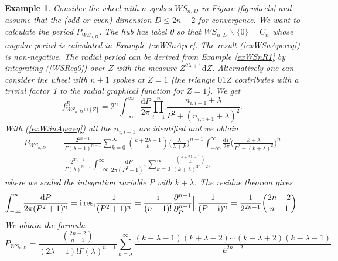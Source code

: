 \documentclass[oneside]{amsart}
\newcommand{\ii}{\mathrm{i}}
\newcommand{\dd}{\mathrm{d}}
\theoremstyle{plain}
\newtheorem{ex}[thm]{Example}
\begin{document}
\begin{ex}\label{exWSn1}
Consider the wheel with $n$ spokes $W\!S_{n,D}$ in Figure \ref{fig:wheels} and assume that the (odd or even) dimension $D\leq2n-2$ for convergence.
We want to calculate the period $P_{W\!S_{n,D}}$. The hub has label 0 so that $W\!S_{n,D}\backslash\{0\}=C_n$
whose angular period is calculated in Example \ref{exWSnAper}. The result (\ref{exWSnApereq}) is non-negative.
The radial period can be derived from Example \ref{exWSnR1} by integrating (\ref{WSReq0}) over $Z$ with the measure
$Z^{2\lambda+1}\dd Z$. Alternatively one can consider the wheel with $n+1$ spokes at $Z=1$ (the triangle $01Z$ contributes with a trivial factor 1 to the radial graphical function for $Z=1$).
We get
$$
f_{W\!S_{n,D}\cup\{Z\}}^R=2^n\int_{-\infty}^\infty\frac{\dd P}{2\pi}\prod_{i=1}^n\frac{n_{i,i+1}+\lambda}{P^2+(n_{i,i+1}+\lambda)^2}.
$$
With (\ref{exWSnApereq}) all the $n_{i,i+1}$ are identified and we obtain
\begin{align*}
P_{W\!S_{n,D}}&=\frac{2^{2n-1}}{\Gamma(\lambda+1)^{n-1}}\sum_{k=0}^\infty\genfrac(){0pt}{}{k+2\lambda-1}{k}\Big(\frac{\lambda}{\lambda+k}\Big)^{n-1}
 \int_{-\infty}^\infty\frac{\dd P}{2\pi}\Big(\frac{k+\lambda}{P^2+(k+\lambda)^2}\Big)^n\\
&=\frac{2^{2n-1}}{\Gamma(\lambda)^{n-1}}\int_{-\infty}^\infty\frac{\dd P}{2\pi(P^2+1)^n}\sum_{k=0}^\infty\frac{\genfrac(){0pt}{}{k+2\lambda-1}{k}}{(k+\lambda)^{2n-2}},
\end{align*}
where we scaled the integration variable $P$ with $k+\lambda$. The residue theorem gives
$$
\int_{-\infty}^\infty\frac{\dd P}{2\pi(P^2+1)^n}=\ii\,\mathrm{res}_\ii\frac{1}{(P^2+1)^n}=\frac{\ii}{(n-1)!}\frac{\partial^{n-1}}{\partial_P^{n-1}}\Big|_\ii\frac{1}{(P+\ii)^n}\\
=\frac{1}{2^{2n-1}}\genfrac(){0pt}{}{2n-2}{n-1}.
$$
We obtain the formula
$$
P_{W\!S_{n,D}}=\frac{\genfrac(){0pt}{}{2n-2}{n-1}}{(2\lambda-1)!\Gamma(\lambda)^{n-1}}\sum_{k=\lambda}^\infty\frac{(k+\lambda-1)(k+\lambda-2)\cdots(k-\lambda+2)(k-\lambda+1)}{k^{2n-2}}.
$$


\end{ex}
\end{document}
